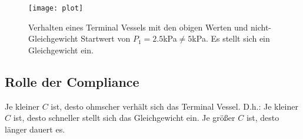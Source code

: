 \documentclass[a4paper,12pt]{scrartcl}
\begin{document}
\begin{figure}[!htb]
  \centering
  \texttt{[image: plot]}
  \caption{Verhalten eines Terminal Vessels mit den obigen Werten und nicht-Gleichgewicht Startwert von $P_1 = 2.5$kPa$\neq 5$kPa. Es stellt sich ein Gleichgewicht ein.}
  \label{}
\end{figure}

\subsection*{Rolle der Compliance}
Je kleiner $C$ ist, desto ohmscher verhält sich das Terminal Vessel. D.h.: Je kleiner $C$ ist, desto schneller stellt sich das Gleichgewicht ein. Je größer $C$ ist, desto länger dauert es.
\end{document}
